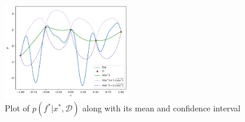 \begin{figure}[H]
    \includegraphics[width=0.49\textwidth]{figures/gp/p(f*|x*,D).pdf}
    \caption{Plot of $p(f^*|x^*,\mathcal{D})$ along with its mean and confidence interval}
\end{figure}